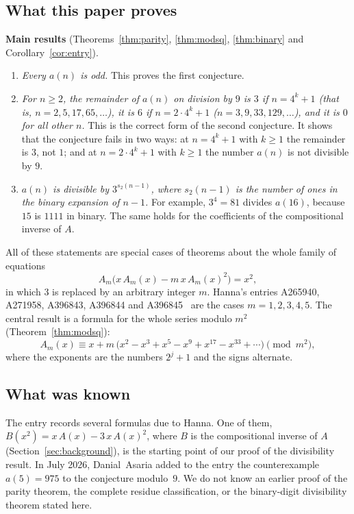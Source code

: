 \documentclass[11pt,a4paper]{article}
\theoremstyle{definition}
\theoremstyle{remark}
\begin{document}
\subsection{What this paper proves}
\textbf{Main results} (Theorems~\ref{thm:parity}, \ref{thm:modsq}, \ref{thm:binary} and Corollary~\ref{cor:entry}).
\begin{enumerate}
\item \emph{Every $a(n)$ is odd.} This proves the first conjecture.
\item \emph{For $n\ge2$, the remainder of $a(n)$ on division by $9$ is $3$ if $n=4^k+1$ (that is, $n=2,5,17,65,\dots$), it is
$6$ if $n=2\cdot4^k+1$ ($n=3,9,33,129,\dots$), and it is $0$ for all other $n$.} This is the correct form of the second
conjecture. It shows that the conjecture fails in two ways: at $n=4^k+1$ with $k\ge1$ the remainder is $3$, not $1$; and at
$n=2\cdot4^k+1$ with $k\ge1$ the number $a(n)$ is not divisible by $9$.
\item \emph{$a(n)$ is divisible by $3^{s_2(n-1)}$, where $s_2(n-1)$ is the number of ones in the binary expansion of
$n-1$.} For example, $3^4=81$ divides $a(16)$, because $15$ is $1111$ in binary. The same holds for the coefficients of
the compositional inverse of $A$.
\end{enumerate}

All of these statements are special cases of theorems about the whole family of equations
\[
A_m\bigl(x\,A_m(x)-m\,x\,A_m(x)^2\bigr)=x^2,
\]
in which $3$ is replaced by an arbitrary integer $m$. Hanna's entries A265940, A271958, A396843,
A396844 and A396845~\cite{oeis1,oeis2,oeis3,oeis4,oeis5} are the cases $m=1,2,3,4,5$. The central result is a
formula for the whole series modulo $m^2$ (Theorem~\ref{thm:modsq}):
\[
A_m(x)\equiv x+m\,\bigl(x^2-x^3+x^5-x^9+x^{17}-x^{33}+\cdots\bigr)\pmod{m^2},
\]
where the exponents are the numbers $2^j+1$ and the signs alternate.

\subsection{What was known}
The entry records several formulas due to Hanna. One of them, $B(x^2)=x\,A(x)-3\,x\,A(x)^2$, where $B$ is
the compositional inverse of $A$ (Section~\ref{sec:background}), is the starting point of our proof of the divisibility
result. In July 2026, Danial~Asaria added to the entry the counterexample $a(5)=975$ to the conjecture modulo~$9$.
We do not know an earlier proof of the parity theorem, the complete residue classification, or the binary-digit divisibility theorem stated here.
\end{document}

